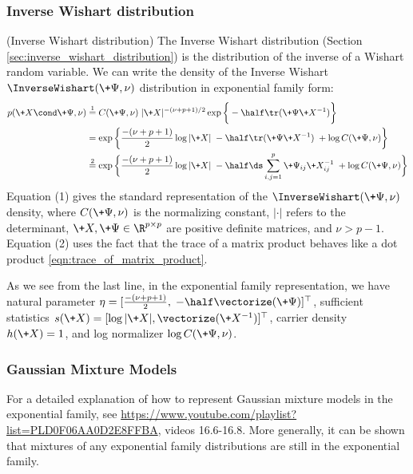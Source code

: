 \documentclass{article} %
\newcommand{\sufficientStatsFunction}{s}
\newcommand{\carrierDensity}{h}
\newcommand{\naturalParam}{\eta}
\begin{document}
\subsubsection{Inverse Wishart distribution}

\begin{example}{(Inverse Wishart distribution)} 
\label{ex:inverse_wishart_as_ef} The Inverse Wishart distribution (Section \ref{sec:inverse_wishart_distribution}) is the distribution of the inverse of a Wishart random variable.   We can write the density of the Inverse Wishart $\InverseWishart(\+\Psi,  \nu)$ distribution in exponential family form:
\begin{align*}
p (\+X  \cond \+\Psi,  \nu) & \stackrel{1}{=} C(\+\Psi,  \nu) \; | \+X | ^{-(\nu + p + 1)/2} \exp \bigg\{ -\half \tr (\+\Psi \+X^{-1} ) \bigg\} \\
& = \exp \bigg\{ \frac{-(\nu + p + 1)}{2}  \log | \+ X | \;  -\half \tr (\+\Psi \+X^{-1} )  \; + \log  C(\+\Psi,  \nu)   \bigg\} \\
& \stackrel{2}{=} \exp \bigg\{ \frac{-(\nu + p + 1)}{2}  \log | \+ X | \;  -\half  \ds\sum_{i,j=1}^p \+\Psi_{ij} \+X^{-1}_{ij} \; + \log  C(\+\Psi,  \nu)   \bigg\} 
\end{align*}
Equation (1) gives the standard representation of the $\InverseWishart(\+\Psi,  \nu)$ density,  where   $C(\+\Psi,  \nu)$ is the normalizing constant,  $| \cdot |$ refers to the determinant,  $\+X,  \+\Psi \in \R^{p \times p}$ are positive definite matrices,  and $\nu > p-1$.    Equation (2) uses the fact that the trace of a matrix product behaves like a dot product \eqref{eqn:trace_of_matrix_product}.      


As we see from the last line,  in the exponential family representation,  we have natural parameter $\naturalParam = [\frac{-(\nu + p + 1)}{2},  \; -\half \vectorize (\+\Psi)]^\top$, sufficient statistics $\sufficientStatsFunction(\+X) = [\log | \+X | , \vectorize (\+X^{-1})]^\top$, carrier density $\carrierDensity(\+X)=1$, and log normalizer $ \log  C(\+\Psi,  \nu)$.   
  
\end{example} 


\subsubsection{Gaussian Mixture Models}


For a detailed explanation of how to represent Gaussian mixture models in the exponential family, see \url{https://www.youtube.com/playlist?list=PLD0F06AA0D2E8FFBA}, videos 16.6-16.8. More generally, it can be shown that mixtures of any exponential family distributions are still in the exponential family. 
\end{document}
